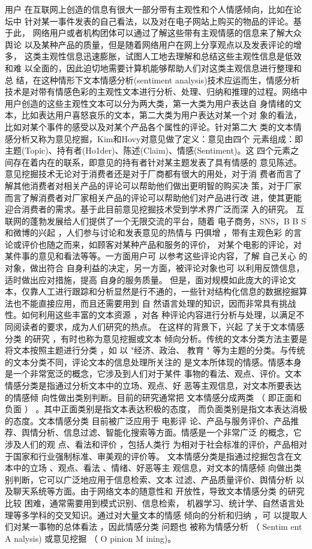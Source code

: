 用户 在互联网上创造的信息有很大一部分带有主观性和个人情感倾向，比如在论坛中 针对某一事件发表的自己看法，以及对在电子网站上购买的物品的评论。基于此， 网络用户或者机构团体可以通过了解这些带有主观情感的信息来了解大众舆论 以及某种产品的质量，但是随着网络用户在网上分享观点以及发表评论的增多， 这类主观性信息迅速膨胀，试图人工地去理解和总结这些主观性信息是低效和难 以全面的，因此迫切地需要计算机能够帮助人们对这类主观信息进行整理和总 结，在这种情形下文本情感分析(sentiment analysis)技术应运而生，情感分析技术是对带有情感色彩的主观性文本进行分析、处理、归纳和推理的过程。网络中用户创造的这些主观性文本可以分为两大类，第一大类为用户表达自 身情绪的文本，比如表达用户喜怒哀乐的文本，第二大类为用户表达对某一个对 象的看法，比如对某个事件的感受以及对某个产品各个属性的评论。针对第二大 类的文本情感分析又称为意见挖掘，Kim和Hovy对意见做了定义：意见由四个 元素组成：即主题(Topic)、持有者(Ho1der)、陈述(Claim)、情感(Sentiment)。这 四个元素之间存在着内在的联系，即意见的持有者针对某主题发表了具有情感的 意见陈述。意见挖掘技术无论对于消费者还是对于厂商都有很大的用处，对于消 费者而言了解其他消费者对相关产品的评论可以帮助他们做出更明智的购买决 策，对于厂家而言了解消费者对厂家相关产品的评论可以帮助他们对产品进行改 进，使其更能迎合消费者的需求。基于此目前意见挖掘技术受到学术界广泛而深 入的研究。
互联网的蓬勃发展给人们提供了一个无限交流的平台，随着 电子商务，SNS，B B S 和微博的兴起 ，人们参与讨论和发表意见的热情与 円俱增 ，带有主观色彩 的言论或评价也随之而来，如顾客对某种产品和服务的评价， 对某个电影的评论，对某件事的意见和看法等等。一方面用户可 以参考这些评论内容，了解 自己关心 的对象，做出符合 自身利益的决定，另一方面，被评论对象也可 以利用反馈信息， 适时做出应对措施，提高 自身的服务质量。 但是，面对规模如此庞大的评论文本，仅靠人工进行跟踪和分析显然是行不通的，一些针对结构化信息的数据挖掘算法也不能直接应用，而且还需要用到 自 然语言处理的知识，因而非常具有挑战性。如何利用这些丰富的文本资源 ，对各 种评论内容进行分析与处理，以满足不同阅读者的要求，成为人们研究的热点。 在这样的背景下，兴起 了关于文本情感分类 的研究 ，有时也称为意见挖掘或文本 倾向分析。传统的文本分类方法主要是将文本按照主题进行分类 ，如 以 "经济、政治、
教育 " 等为主题的分类。与传统的文本分类不同，评论文本的信息处理所关注的 是文本所体现的情感。情感本身是一个非常宽泛的概念，它涉及到人们对于某件 事物的看法、观点、评价。文本情感分类是指通过分析文本中的立场、观点、好 恶等主观信息，对文本所要表达的情感倾 向性做出类别判断。目前的研究通常把 文本情感分成两类 （
即正面和负面 ） 。其中正面类别是指文本表达积极的态度，
而负面类别是指文本表达消极的态度。文本情感分类 目前被广泛应用于 电影评 论、产品与服务评价、产品推荐、舆情分析、信息过滤、智能化搜索等方面。情感是一个非常广泛 的概念，它涉及人们的观 点、看法和评价 ，包括人类行
为相对于社会标准的评价，产品相对于国家和行业强制标准、审美观的评价等。 文本情感分类是指通过挖掘包含在文本中的立场 、观点、看法 、情绪、好恶等主 观信息，对文本的情感倾 向做出类别判断，它可以广泛地应用于信息检索、文本 过滤、产品质量评价、舆情分析 以及聊天系统等方面。由于网络文本的随意性和 开放性，导致文本情感分类 的研究 比较 困难，通常需要用到模式识别、信息检索， 机器学习、统计学、自然语言处理等多学科的交叉知识。通过对大量文本的情感 倾向的分析和归纳 ，可 以提取人们对某一事物的总体看法 ，因此情感分类 问题也
被称为情感分析 （ Sentim ent A nalysis) 或意见挖掘 （ O pinion M ining)。

